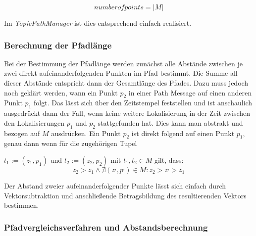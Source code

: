 \begin{equation*}
  \label{eqn:numofpoints}
  number of points = \vert M \vert
\end{equation*}

Im \textit{TopicPathManager} ist dies entsprechend einfach realisiert.

\subsubsection{Berechnung der Pfadlänge}
Bei der Bestimmung der Pfadlänge werden zunächst alle Abstände zwischen je
zwei direkt aufeinanderfolgenden Punkten im Pfad bestimmt. Die Summe all dieser
Abstände entspricht dann der Gesamtlänge des Pfades. Dazu muss jedoch noch
geklärt werden, wann ein Punkt $p_2$ in einer Path Message auf einen anderen
Punkt $p_1$ folgt. Das lässt sich über den Zeitstempel feststellen und ist
anschaulich ausgedrückt dann der Fall, wenn keine weitere Lokalisierung in
der Zeit zwischen den Lokalisierungen $p_1$ und $p_2$ stattgefunden hat. Dies
kann man abstrakt und bezogen auf $M$ ausdrücken.  Ein Punkt $p_2$ ist direkt
folgend auf einen Punkt $p_1$, genau dann wenn für die zugehörigen Tupel

$t_1 := (z_1, p_1)$ und $t_2 := (z_2, p_2)$
mit
$t_1,t_2 \in M$
gilt, dass:
\[
z_2 > z_1 \wedge \nexists (z^{,}, p^{,}) \in M : z_2 > z^{,} > z_1
\]

Der Abstand zweier aufeinanderfolgender Punkte lässt sich einfach durch
Vektorsubtraktion und anschließende Betragsbildung des resultierenden Vektors
bestimmen.

\subsubsection{Pfadvergleichsverfahren und Abstandsberechnung}

